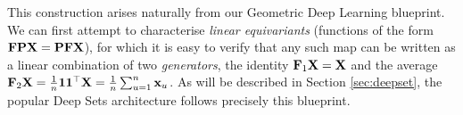 This construction arises naturally from our Geometric Deep Learning blueprint. 
We can first attempt to characterise {\em linear equivariants} (functions of the form $\mathbf{F} {\bf P X} = \bf{P} \mathbf{FX}$), for which it is easy to verify 
that any such map can be written as a linear combination of two \emph{generators}, the identity $\mathbf{F}_1 \mathbf{X} = {\bf X}$ and the average ${\mathbf{F}_2 \mathbf{X}}= \frac{1}{n}\boldsymbol{1}\boldsymbol{1}^\top \mathbf{X} = \frac{1}{n} \sum_{u=1}^n {\bf x}_u$. As will be described in Section \ref{sec:deepset}, the popular Deep Sets \citep{zaheer2017deep} architecture follows precisely this blueprint.




